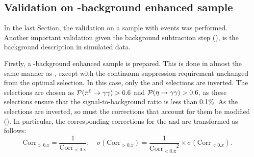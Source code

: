 \subsection{Validation on \texorpdfstring{\BB}{BB}-background enhanced sample}\label{sec:bb_background_validation}

In the last Section, the validation on a sample with \epem\ra\qqbar events was performed.
Another important validation given the background subtraction step (),
is the \BB background description in simulated data.

Firstly, a \BB-background enhanced sample is prepared.
This is done in almost the same manner as , except with the continuum suppression requirement unchanged from the optimal selection.
In this case, only the \piVeto and \etaVeto selections are inverted.
The selections are chosen as ${\mathcal{P}(\pi^0\rightarrow\gamma\gamma)}>0.6$ and ${\mathcal{P}(\eta\rightarrow\gamma\gamma)}>0.6$, as these selections ensure that the signal-to-background ratio is less than 0.1\%.
As the selections are inverted, so must the corrections that account for them be modified ().
In particular, the corresponding corrections for the \piVeto and \etaVeto are transformed as follows:
\begin{equation}\label{eq:correction_transform}
    \mathrm{Corr}_{>0.x} = \frac{1}{\mathrm{Corr_{<0.x}}}; \quad \sigma(\mathrm{Corr}_{>0.x}) =  \frac{1}{\mathrm{Corr_{<0.x}}^2} \times \sigma(\mathrm{Corr}_{<0.x}).
\end{equation}

